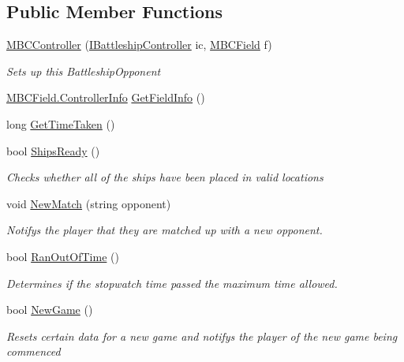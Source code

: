 \subsection*{Public Member Functions}
\begin{DoxyCompactItemize}
\item 
\hyperlink{class_m_b_c_1_1_core_1_1_m_b_c_controller_afb994412d4f068a7d26fa1c93674eb46}{M\-B\-C\-Controller} (\hyperlink{interface_m_b_c_1_1_core_1_1_i_battleship_controller}{I\-Battleship\-Controller} ic, \hyperlink{class_m_b_c_1_1_core_1_1_m_b_c_field}{M\-B\-C\-Field} f)
\begin{DoxyCompactList}\small\item\em Sets up this Battleship\-Opponent\end{DoxyCompactList}\item 
\hyperlink{class_m_b_c_1_1_core_1_1_m_b_c_field_1_1_controller_info}{M\-B\-C\-Field.\-Controller\-Info} \hyperlink{class_m_b_c_1_1_core_1_1_m_b_c_controller_acb3ab8129350253c05ddec78453667b9}{Get\-Field\-Info} ()
\item 
long \hyperlink{class_m_b_c_1_1_core_1_1_m_b_c_controller_a1bece04a38c242df2f13a98185d4c1ec}{Get\-Time\-Taken} ()
\item 
bool \hyperlink{class_m_b_c_1_1_core_1_1_m_b_c_controller_a1fe68669f6933ec1c986ef6ed655a86e}{Ships\-Ready} ()
\begin{DoxyCompactList}\small\item\em Checks whether all of the ships have been placed in valid locations\end{DoxyCompactList}\item 
void \hyperlink{class_m_b_c_1_1_core_1_1_m_b_c_controller_a938b439be5423a1ac4d51df18e5e9448}{New\-Match} (string opponent)
\begin{DoxyCompactList}\small\item\em Notifys the player that they are matched up with a new opponent.\end{DoxyCompactList}\item 
bool \hyperlink{class_m_b_c_1_1_core_1_1_m_b_c_controller_a7f2a2b16b2b36da62f9d2fb92f5fe83d}{Ran\-Out\-Of\-Time} ()
\begin{DoxyCompactList}\small\item\em Determines if the stopwatch time passed the maximum time allowed.\end{DoxyCompactList}\item 
bool \hyperlink{class_m_b_c_1_1_core_1_1_m_b_c_controller_aa0f339c6241f0cb313f6288985138494}{New\-Game} ()
\begin{DoxyCompactList}\small\item\em Resets certain data for a new game and notifys the player of the new game being commenced\end{DoxyCompactList}\item 

\end{DoxyCompactItemize}
